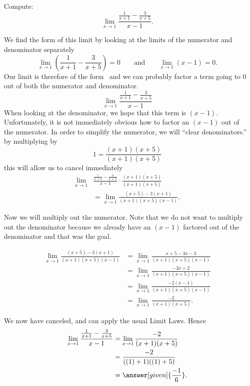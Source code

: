 \documentclass{ximera}
\begin{document}
\begin{example}
  Compute:
  \[
  \lim_{x\to 1} \frac{\frac{1}{x+1}-\frac{3}{x+5}}{x-1}.
  \]
\begin{explanation}
  We find the form of this limit by looking at the limits of the
  numerator and denominator separately
  \[
  \lim_{x\to 1}\left(\frac{1}{x+1}-\frac{3}{x+5}\right)=0\qquad\text{and}\qquad\lim_{x\to 1}\left(x-1\right)=0.
  \]
  Our limit is therefore of the form \zeroOverZero\ and we can
  probably factor a term going to $0$ out of both the numerator and
  denominator.
  \[
  \lim_{x\to 1} \frac{\frac{1}{x+1}-\frac{3}{x+5}}{x-1}
  \]
  When looking at the denominator, we hope that this
  term is $(x-1)$.  Unfortunately, it is not immediately obvious how to
  factor an $(x-1)$ out of the numerator.  In order to simplify the
  numerator, we will ``clear denominators.'' by multiplying by
  \[
  1 = \frac{(x+1)(x+5)}{(x+1)(x+5)}
  \]
  this will allow us to cancel immediately
\begin{align*}
  \lim_{x\to 1}& \frac{\frac{1}{x+1}-\frac{3}{x+5}}{x-1}  \cdot \frac{(x+1)(x+5)}{(x+1)(x+5)} \\
  &= \lim_{x\to 1}\frac{(x+5)-3(x+1)}{(x+1)(x+5)(x-1)}.
\end{align*}

Now we will multiply out the numerator.  Note that we do not want to
multiply out the denominator because we already have an $(x-1)$
factored out of the denominator and that was the goal.

\begin{align*}
\lim_{x\to 1}\frac{(x+5)-3(x+1)}{(x+1)(x+5)(x-1)} &= \lim_{x\to 1}\frac{x+5-3x-3}{(x+1)(x+5)(x-1)} \\
&= \lim_{x\to 1}\frac{-2x+2}{(x+1)(x+5)(x-1)}\\
&= \lim_{x\to 1}\frac{-2(x-1)}{(x+1)(x+5)(x-1)}\\
&= \lim_{x\to 1}\frac{-2}{(x+1)(x+5)}.
\end{align*}
  
We now have canceled, and can apply the usual Limit Laws.  Hence
\begin{align*}
\lim_{x\to 1} \frac{\frac{1}{x+1}-\frac{3}{x+5}}{x-1}&=\lim_{x\to
  1}\frac{-2}{(x+1)(x+5)}\\
&= \frac{-2}{((1)+1)((1)+5)} \\
&=\answer[given]{\frac{-1}{6}}.
\end{align*}
\end{explanation}
\end{example}
\end{document}
